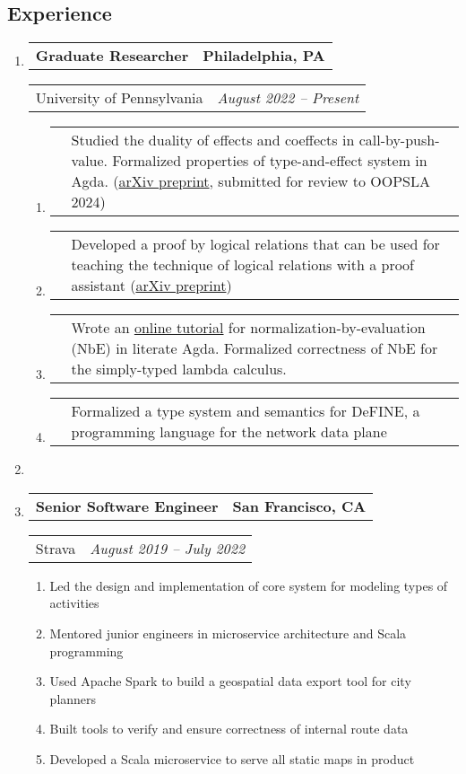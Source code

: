 \documentclass[letterpaper]{article}
\makeatletter
\newcommand*{\tabulardef}[3]{\begin{tabular}[t]{@{}lp{\dimexpr\linewidth-#1}@{}}
    #2&#3
\end{tabular}}
\newcommand{\headerrow}[2]
{\begin{tabular*}{\linewidth}{l@{\extracolsep{\fill}}r}
	#1 &
	#2 \\
\end{tabular*}}
\makeatother
\begin{document}
\subsection*{Experience}

\begin{enumerate}[label=]
	\parskip=-0.25em

	\item
		\headerrow
			{\textbf{Graduate Researcher}}
			{\textbf{Philadelphia, PA}}
	\headerrow
		{University of Pennsylvania}
        {\emph{August 2022 -- Present}}
	\begin{enumerate}[label= *]
	\parskip=-0.1em
        \item\tabulardef{4cm}{}{Studied the duality of effects and coeffects in call-by-push-value.
            Formalized properties of type-and-effect system in Agda. (\href{https://arxiv.org/abs/2311.11795}{arXiv preprint}, submitted for review to OOPSLA 2024)}
        \item\tabulardef{4cm}{}{Developed a proof by logical relations that can be used for teaching the technique of logical relations with a proof assistant
            (\href{https://arxiv.org/abs/2309.15724}{arXiv preprint})}
        \item\tabulardef{4cm}{}{Wrote an \href{https://emmanuelsuarez.com/posts/2023-11-21-nbe.html}{online tutorial} for normalization-by-evaluation (NbE) in
            literate Agda. Formalized correctness of NbE for the simply-typed lambda calculus.}
        \item\tabulardef{4cm}{}{Formalized a type system and semantics for DeFINE, a programming
            language for the network data plane}
	\end{enumerate}

    \item

	\item
		\headerrow
			{\textbf{Senior Software Engineer}}
			{\textbf{San Francisco, CA}}
	\headerrow
		{Strava}
		{\emph{August 2019 -- July 2022}}
	\begin{enumerate}[label= *]
	\parskip=-0.1em
        \item Led the design and implementation of core system for modeling types of activities
        \item Mentored junior engineers in microservice architecture and Scala programming
		\item Used Apache Spark to build a geospatial data export tool for city planners
		\item Built tools to verify and ensure correctness of internal route data
		\item Developed a Scala microservice to serve all static maps in product
	\end{enumerate}
	

\end{enumerate}
\end{document}
